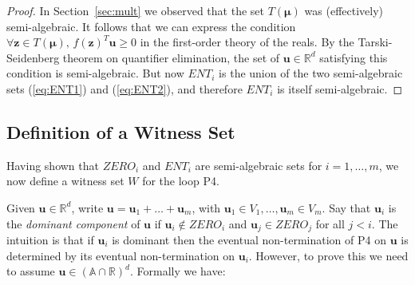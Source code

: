 \begin{proof}
In Section~\ref{sec:mult} we observed that the set
$T(\boldsymbol{\mu})$ was (effectively) semi-algebraic.  It follows
that we can express the condition $\forall \boldsymbol{z}\in
T(\boldsymbol{\mu}),\, f(\boldsymbol{z})^T\boldsymbol{u}\geq 0$ in the
first-order theory of the reals.  By the Tarski-Seidenberg theorem
\cite{Tar51} on quantifier elimination, the set of $\boldsymbol{u}\in
\mathbb{R}^d$ satisfying this condition is semi-algebraic.  But now
$\mathit{ENT}_i$ is the union of the two semi-algebraic sets
(\ref{eq:ENT1}) and (\ref{eq:ENT2}), and therefore $\mathit{ENT}_i$ is
itself semi-algebraic.
\end{proof}
\subsection{Definition of a Witness Set}
Having shown that $\mathit{ZERO}_i$ and $\mathit{ENT}_i$ are
semi-algebraic sets for $i=1,\ldots,m$, we now define a witness set
$W$ for the loop \textsf{P4}.

Given $\boldsymbol{u} \in \mathbb{R}^d$, write $\boldsymbol{u}=
\boldsymbol{u}_1+\ldots+\boldsymbol{u}_m$, with $\boldsymbol{u}_1 \in
V_1,\ldots,\boldsymbol{u}_m\in V_m$.  Say that $\boldsymbol{u}_i$ is
the \emph{dominant component} of $\boldsymbol{u}$ if
$\boldsymbol{u}_i\not\in \mathit{ZERO}_i$ and
$\boldsymbol{u}_j\in\mathit{ZERO}_j$ for all $j<i$.  The intuition is
that if $\boldsymbol{u}_i$ is dominant then the eventual
non-termination of \textsf{P4} on $\boldsymbol{u}$ is determined by
its eventual non-termination on $\boldsymbol{u}_i$.  However, to prove
this we need to assume $\boldsymbol{u}\in (\mathbb{A}\cap\mathbb{R})^d$.  Formally we
have:

